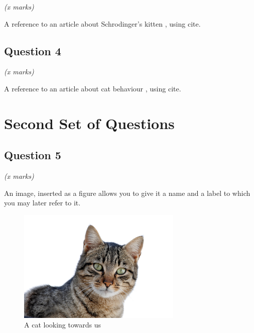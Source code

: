 \documentclass[11pt,fleqn]{book} %
\begin{document}
\begin{flushright}
    \textit{(x marks)}
\end{flushright}

\vspace{20px}

A reference to an article about Schrodinger's kitten \cite{mikheev2019}, using cite.


\section{Question 4}

\begin{flushright}
    \textit{(x marks)}
\end{flushright}

A reference to an article about cat behaviour \cite{gazzano2015}, using cite.




\chapter{Second Set of Questions}

\section{Question 5}

\begin{flushright}
    \textit{(x marks)}
\end{flushright}

An image, inserted as a figure allows you to give it a name and a label to which you may later refer to it.

\begin{figure}[h] %
    \centering
    \includegraphics[width=0.7\textwidth]{Pictures/CatPicture.jpg} %
    \caption{A cat looking towards us}
    \label{fig:catPicture}
\end{figure}
\end{document}
